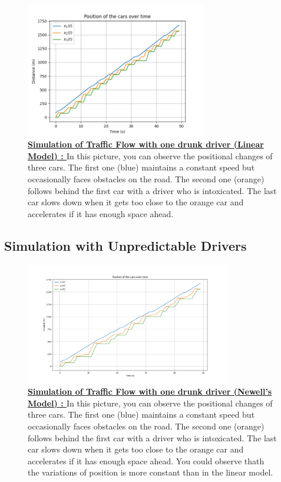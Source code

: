 \documentclass{article}
\begin{document}
		\begin{figure}[H]
			\centering
			\includegraphics[width=0.70\textwidth]{Model1W3C_O_Aco_D2.png}
			\caption[Simulation of Traffic Flow with one drunk driver (Linear Model).]{\textbf{\underline{Simulation of Traffic Flow with one drunk driver (Linear Model) : }} In this picture, you can observe the positional changes of three cars. The first one (blue) maintains a constant speed but occasionally faces obstacles on the road. The second one (orange) follows behind the first car with a driver who is intoxicated. The last car slows down when it gets too close to the orange car and accelerates if it has enough space ahead.}
			\label{fig:Model1W3C_O_Aco_D2}
		\end{figure}
		
		\subsection{Simulation with Unpredictable Drivers}
		
		
		\begin{figure}[H]
			\centering
			\includegraphics[width=0.8\textwidth]{Model1W3C_O_Aco_I2.png}
			\caption[Simulation of Traffic Flow with one drunk driver (Newell's Model).]{\textbf{\underline{Simulation of Traffic Flow with one drunk driver (Newell's Model) : }} In this picture, you can observe the positional changes of three cars. The first one (blue) maintains a constant speed but occasionally faces obstacles on the road. The second one (orange) follows behind the first car with a driver who is intoxicated. The last car slows down when it gets too close to the orange car and accelerates if it has enough space ahead. You could observe thath the variations of position is more constant than in the linear model.}
			\label{fig:Model1W3C_O_Aco_I2}
		\end{figure}
		
\end{document}
